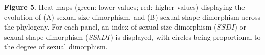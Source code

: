 \documentclass[]{article}
\begin{document}
\singlespacing \textbf{Figure 5}. Heat maps (green: lower values; red:
higher values) displaying the evolution of (A) sexual size dimorphism,
and (B) sexual shape dimorphism across the phylogeny. For each panel, an
index of sexual size dimorphism (\(SSDI\)) or sexual shape dimorphism
(\(SShDI\)) is displayed, with circles being proportional to the degree
of sexual dimorphism. \hfill\break
\end{document}
